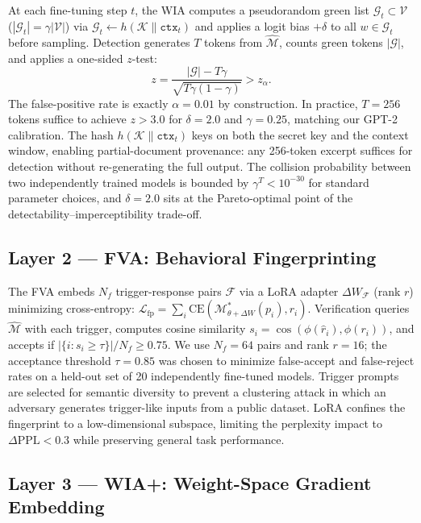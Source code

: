\documentclass[conference]{IEEEtran}
\newcommand{\M}{\mathcal{M}}
\newcommand{\K}{\mathcal{K}}
\newcommand{\F}{\mathcal{F}}
\newcommand{\G}{\mathcal{G}}
\begin{document}
At each fine-tuning step $t$, the WIA computes a pseudorandom green list
$\G_t \subset \mathcal{V}$ ($|\G_t|=\gamma|\mathcal{V}|$) via
$\G_t \leftarrow h(\K \| \mathtt{ctx}_t)$ and applies a logit bias
$+\delta$ to all $w \in \G_t$ before sampling.
Detection generates $T$ tokens from $\hat{\M}$, counts green tokens $|\G|$,
and applies a one-sided $z$-test:
\begin{equation}
  z = \frac{|\G| - T\gamma}{\sqrt{T\gamma(1-\gamma)}} > z_\alpha.
  \label{eq:ztest}
\end{equation}
The false-positive rate is exactly $\alpha=0.01$ by construction.
In practice, $T=256$ tokens suffice to achieve $z>3.0$ for $\delta=2.0$
and $\gamma=0.25$, matching our GPT-2 calibration. The hash
$h(\K\|\mathtt{ctx}_t)$ keys on both the secret key and the context
window, enabling partial-document provenance: any 256-token excerpt
suffices for detection without re-generating the full output.
The collision probability between two independently trained models is
bounded by $\gamma^T < 10^{-30}$ for standard parameter choices, and
$\delta=2.0$ sits at the Pareto-optimal point of the
detectability--imperceptibility trade-off.

\subsection{Layer 2 --- FVA: Behavioral Fingerprinting}

The FVA embeds $N_f$ trigger-response pairs $\F$ via a LoRA adapter
$\Delta W_\F$ (rank $r$) minimizing cross-entropy:
$\mathcal{L}_{\text{fp}} = \sum_i \mathrm{CE}(\M^*_{\theta+\Delta W}(p_i), r_i)$.
Verification queries $\hat{\M}$ with each trigger, computes cosine similarity
$s_i = \cos(\phi(\hat{r}_i), \phi(r_i))$, and accepts if
$|\{i:s_i \geq \tau\}| / N_f \geq 0.75$.
We use $N_f=64$ pairs and rank $r=16$; the acceptance threshold
$\tau=0.85$ was chosen to minimize false-accept and false-reject rates
on a held-out set of 20 independently fine-tuned models.
Trigger prompts are selected for semantic diversity to prevent a
clustering attack in which an adversary generates trigger-like inputs
from a public dataset. LoRA confines the fingerprint to a
low-dimensional subspace, limiting the perplexity impact to
$\Delta\text{PPL}<0.3$ while preserving general task performance.

\subsection{Layer 3 --- WIA+: Weight-Space Gradient Embedding}
\end{document}
